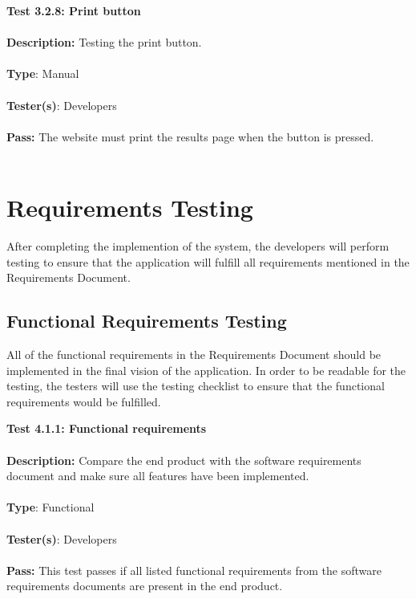 \documentclass[12pt]{article}
\begin{document}
\begin{tcolorbox}
\textbf{Test 3.2.8: Print button} \\ \\
\textbf{Description:} Testing the print button.  \\ \\
\textbf{Type}: Manual \\ \\
\textbf{Tester(s)}: Developers \\ \\
\textbf{Pass:} The website must print the results page when the button is pressed. \\ \\
\end{tcolorbox}

\section{Requirements Testing}
After completing the implemention of the system, the developers will perform testing to ensure that the application will fulfill all requirements mentioned in the Requirements Document.

\subsection{Functional Requirements Testing}
All of the functional requirements in the Requirements Document should be implemented in the final vision of the application. In order to be readable for the testing, the testers will use the testing checklist to ensure that the functional requirements would be fulfilled.

\begin{tcolorbox}
\textbf{Test 4.1.1: Functional requirements } \\ \\
\textbf{Description:} Compare the end product with the software requirements document and make sure all features have been implemented. \\ \\
\textbf{Type}: Functional \\ \\
\textbf{Tester(s)}: Developers \\ \\
\textbf{Pass:} This test passes if all listed functional requirements from the software requirements documents are present in the end product. \\ \\
\end{tcolorbox}
\end{document}
